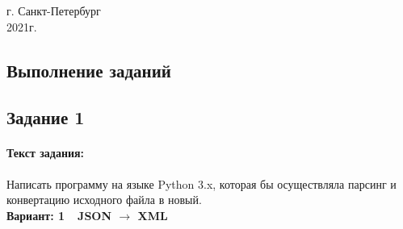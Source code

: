 \documentclass[12pt,onecolumn]{article}
\begin{document}
\vspace{10cm}
\begin{center}
    г. Санкт-Петербург\\
    2021г.
\end{center}
\thispagestyle{empty}
\newpage
\setcounter{page}{1}
\tableofcontents
\newpage
\begin{flushleft}
\section{Выполнение заданий}
\subsection{Задание 1}
\paragraph{Текст задания:}
\hfill \break
Написать программу на языке Python 3.x, которая бы осуществляла парсинг и конвертацию исходного файла в новый.\\
\textbf{Вариант: 1~~JSON $\rightarrow$ XML}\\

\end{flushleft}
\end{document}
